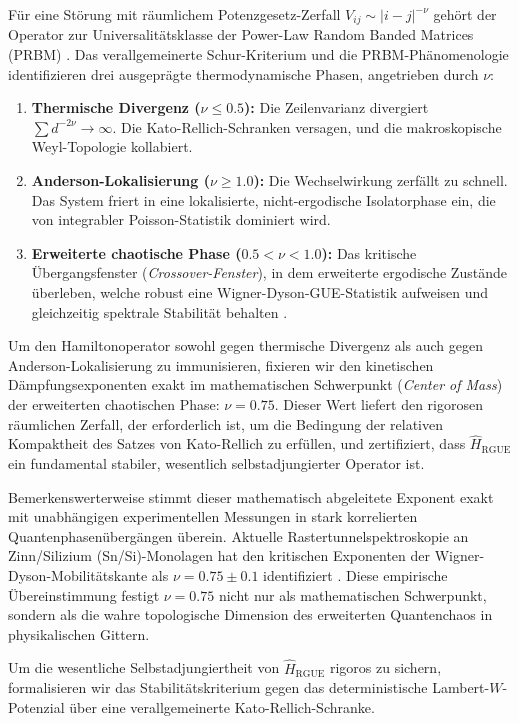 \documentclass[aps,prl,preprint,superscriptaddress,floatfix]{revtex4-2}
\begin{document}
Für eine Störung mit räumlichem Potenzgesetz-Zerfall $V_{ij} \sim |i-j|^{-\nu}$ gehört der Operator zur Universalitätsklasse der Power-Law Random Banded Matrices (PRBM) \cite{Mirlin1996}. Das verallgemeinerte Schur-Kriterium und die PRBM-Phänomenologie identifizieren drei ausgeprägte thermodynamische Phasen, angetrieben durch $\nu$:
\begin{enumerate}
    \item \textbf{Thermische Divergenz ($\nu \le 0.5$):} Die Zeilenvarianz divergiert $\sum d^{-2\nu} \to \infty$. Die Kato-Rellich-Schranken versagen, und die makroskopische Weyl-Topologie kollabiert.
    \item \textbf{Anderson-Lokalisierung ($\nu \ge 1.0$):} Die Wechselwirkung zerfällt zu schnell. Das System friert in eine lokalisierte, nicht-ergodische Isolatorphase ein, die von integrabler Poisson-Statistik dominiert wird.
    \item \textbf{Erweiterte chaotische Phase ($0.5 < \nu < 1.0$):} Das kritische Übergangsfenster (\textit{Crossover-Fenster}), in dem erweiterte ergodische Zustände überleben, welche robust eine Wigner-Dyson-GUE-Statistik aufweisen und gleichzeitig spektrale Stabilität behalten \cite{Bourgade2020}.
\end{enumerate}

Um den Hamiltonoperator sowohl gegen thermische Divergenz als auch gegen Anderson-Lokalisierung zu immunisieren, fixieren wir den kinetischen Dämpfungsexponenten exakt im mathematischen Schwerpunkt (\textit{Center of Mass}) der erweiterten chaotischen Phase: \textbf{$\nu = 0.75$}. Dieser Wert liefert den rigorosen räumlichen Zerfall, der erforderlich ist, um die Bedingung der relativen Kompaktheit des Satzes von Kato-Rellich zu erfüllen, und zertifiziert, dass $\hat{H}_{\text{RGUE}}$ ein fundamental stabiler, wesentlich selbstadjungierter Operator ist.

Bemerkenswerterweise stimmt dieser mathematisch abgeleitete Exponent exakt mit unabhängigen experimentellen Messungen in stark korrelierten Quantenphasenübergängen überein. Aktuelle Rastertunnelspektroskopie an Zinn/Silizium (Sn/Si)-Monolagen hat den kritischen Exponenten der Wigner-Dyson-Mobilitätskante als $\nu = 0.75 \pm 0.1$ identifiziert \cite{Geoffroy2025}. Diese empirische Übereinstimmung festigt $\nu = 0.75$ nicht nur als mathematischen Schwerpunkt, sondern als die wahre topologische Dimension des erweiterten Quantenchaos in physikalischen Gittern.

Um die wesentliche Selbstadjungiertheit von $\hat{H}_{\text{RGUE}}$ rigoros zu sichern, formalisieren wir das Stabilitätskriterium gegen das deterministische Lambert-$W$-Potenzial über eine verallgemeinerte Kato-Rellich-Schranke.
\end{document}
